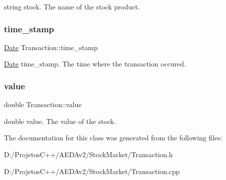 string stock. The name of the stock product. \mbox{\label{class_transaction_a94ff0c865db09881fa3becfdad25ce5d}} 
\subsubsection{\texorpdfstring{time\+\_\+stamp}{time\_stamp}}
{\footnotesize\ttfamily \hyperlink{class_date}{Date} Transaction\+::time\+\_\+stamp\hspace{0.3cm}{\ttfamily [private]}}

\hyperlink{class_date}{Date} time\+\_\+stamp. The time where the transaction occured. \mbox{\label{class_transaction_a75d644553218251b030313776ff33f51}} 
\subsubsection{\texorpdfstring{value}{value}}
{\footnotesize\ttfamily double Transaction\+::value\hspace{0.3cm}{\ttfamily [private]}}

double value. The value of the stock. 

The documentation for this class was generated from the following files\+:\begin{DoxyCompactItemize}
\item 
D\+:/\+Projetos\+C++/\+A\+E\+D\+Av2/\+Stock\+Market/Transaction.\+h\item 
D\+:/\+Projetos\+C++/\+A\+E\+D\+Av2/\+Stock\+Market/Transaction.\+cpp\end{DoxyCompactItemize}
